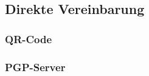 \documentclass[10pt, a4paper]{scrreprt}
\begin{document}
\subsection{Direkte Vereinbarung}
\subsubsection{QR-Code}
\subsubsection{PGP-Server}


\end{document}

